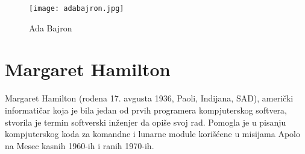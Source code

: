 \documentclass[a4paper,12pt]{article}
\begin{document}
\begin{figure}[h]
    \centering
    \texttt{[image: adabajron.jpg]}
    \caption{Ada Bajron}
    \label{fig:my_label}
\end{figure}

\section{Margaret Hamilton}

\begin{flushleft}
 Margaret Hamilton (rođena 17. avgusta 1936, Paoli, Indijana, SAD), američki informatičar koja je bila jedan od prvih programera kompjuterskog softvera, stvorila je termin softverski inženjer da opiše svoj rad. Pomogla je u pisanju kompjuterskog koda za komandne i lunarne module korišćene u misijama Apolo na Mesec kasnih 1960-ih i ranih 1970-ih.


\end{flushleft}
\end{document}
